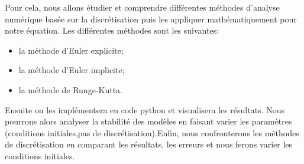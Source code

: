 Pour cela, nous allons étudier et comprendre différentes méthodes d'analyse numérique basée sur la discrétisation puis les appliquer mathématiquement pour notre équation.
\newline
Les différentes méthodes sont les suivantes:
\begin{itemize}
    \item la méthode d'Euler explicite;
    \item la méthode d'Euler implicite;
    \item la méthode de Runge-Kutta.
\end{itemize}
Ensuite on les implémentera en code python et visualisera les résultats. Nous pourrons alors analyser la stabilité des modèles en faisant varier les paramètres (conditions initiales,pas de discrétisation).Enfin, nous confronterons les méthodes de discrétisation en comparant les résultats, les erreurs et nous ferons varier les conditions initiales.\\


